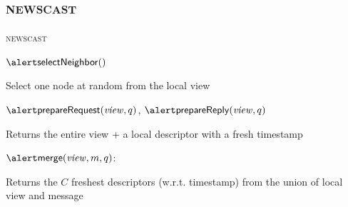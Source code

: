 \subsection{\textsc{newscast}}

\begin{frame}{\textsc{newscast}}
	
\BI
\item $\SelectNeighbor()$\\
\BI
	\item Select one node at random from the local view
\EI
\item $\ExtractRequest(\View, q)$, $\ExtractReply(\View, q)$\\
\BI
	\item Returns the entire view + a local descriptor with a fresh timestamp
\EI
\item $\Merge(\View, m, q)$:\\
\BI
	\item Returns the $C$ freshest descriptors (w.r.t. timestamp) from the union of local view and message
\EI
\EI
	
\begin{Bib}
\end{Bib}	
	
\end{frame}

